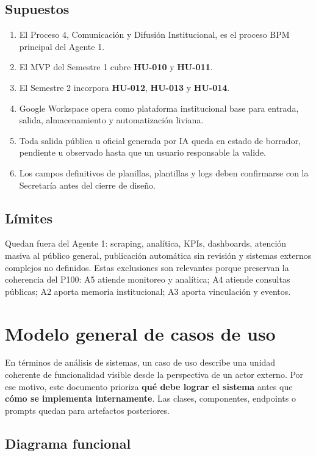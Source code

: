 \documentclass[11pt,a4paper]{article}
\newcommand{\historia}[1]{\textbf{#1}}
\begin{document}
\subsection{Supuestos}

\begin{enumerate}
  \item El Proceso 4, Comunicación y Difusión Institucional, es el proceso BPM principal del Agente 1.
  \item El MVP del Semestre 1 cubre \historia{HU-010} y \historia{HU-011}.
  \item El Semestre 2 incorpora \historia{HU-012}, \historia{HU-013} y \historia{HU-014}.
  \item Google Workspace opera como plataforma institucional base para entrada, salida, almacenamiento y automatización liviana.
  \item Toda salida pública u oficial generada por IA queda en estado de borrador, pendiente u observado hasta que un usuario responsable la valide.
  \item Los campos definitivos de planillas, plantillas y logs deben confirmarse con la Secretaría antes del cierre de diseño.
\end{enumerate}

\subsection{Límites}

Quedan fuera del Agente 1: scraping, analítica, KPIs, dashboards, atención masiva al público general, publicación automática sin revisión y sistemas externos complejos no definidos. Estas exclusiones son relevantes porque preservan la coherencia del P100: A5 atiende monitoreo y analítica; A4 atiende consultas públicas; A2 aporta memoria institucional; A3 aporta vinculación y eventos.

\section{Modelo general de casos de uso}

En términos de análisis de sistemas, un caso de uso describe una unidad coherente de funcionalidad visible desde la perspectiva de un actor externo. Por ese motivo, este documento prioriza \textbf{qué debe lograr el sistema} antes que \textbf{cómo se implementa internamente}. Las clases, componentes, endpoints o prompts quedan para artefactos posteriores.

\subsection{Diagrama funcional}
\end{document}
